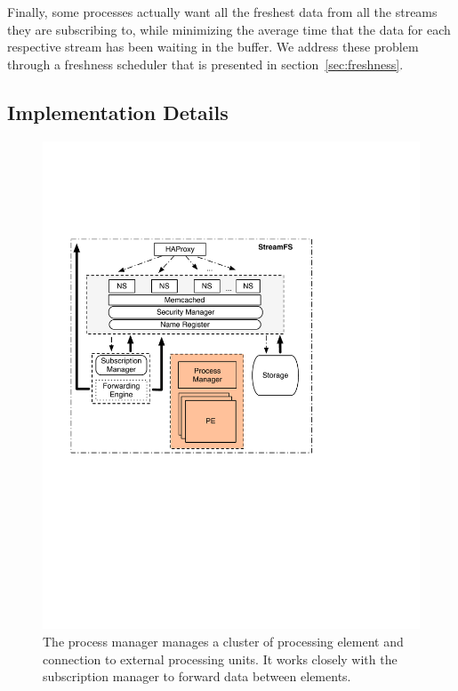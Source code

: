 
Finally, some processes actually want all the freshest
data from all the streams they are subscribing to, while minimizing the average time that the data for each respective stream has 
been waiting in the buffer.  We address these problem through a freshness scheduler that is presented in section~\ref{sec:freshness}.



\subsection{Implementation Details}

\begin{figure}[h!] %
\centering
\includegraphics[width=.55\columnwidth]{figs/procmngr}
\caption{The process manager manages a cluster of processing element and connection to external processing units.  It works
closely with the subscription manager to forward data between elements.}
\label{fig:procmngr}
\end{figure}


